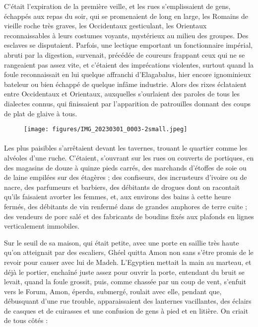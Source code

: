 \documentclass[a4paper, 11pt, oneside, polutonikogreek, french]{article}
\begin{document}
C'était l'expiration de la première veille, et les rues s'emplissaient de gens, échappés aux repas du soir, qui se promenaient de long en large, les Romains de vieille roche très graves, les Occidentaux gesticulant, les Orientaux reconnaissables à leurs costumes voyants, mystérieux au milieu des groupes. Des esclaves se disputaient. Parfois, une lectique emportant un fonctionnaire impérial, abruti par la digestion, survenait, précédée de coureurs frappant ceux qui ne se rangeaient pas assez vite, et c'étaient des imprécations violentes, surtout quand la foule reconnaissait en lui quelque affranchi d'Elagabalus, hier encore ignominieux bateleur ou bien échappé de quelque infâme industrie. Alors des rixes éclataient entre Occidentaux et Orientaux, auxquelles s'ourlaient des paroles de tous les dialectes connus, qui finissaient par l'apparition de patrouilles donnant des coups de plat de glaive à tous.
\clearpage
\begin{landscape}
\pagestyle{fancy}
\fancyhf{}
\cfoot{\thepage}
\begin{figure}[H]
\centering
\texttt{[image: figures/IMG\_20230301\_0003-2small.jpeg]}
\end{figure}
\end{landscape}
\clearpage
\paragraph{}
Les plus paisibles s'arrêtaient devant les tavernes, trouant le quartier comme les alvéoles d'une ruche. C'étaient, s'ouvrant sur les rues ou couverts de portiques, en des magasins de douze à quinze pieds carrés, des marchands d'étoffes de soie ou de laine empilées sur des étagères ; des confiseurs, des incrusteurs d'ivoire ou de nacre, des parfumeurs et barbiers, des débitants de drogues dont on racontait qu'ils faisaient avorter les femmes, et, aux environs des bains à cette heure fermés, des débitants de vin renfermé dans de grandes amphores de terre cuite ; des vendeurs de porc salé et des fabricants de boudins fixés aux plafonds en lignes verticalement immobiles.

Sur le seuil de sa maison, qui était petite, avec une porte en saillie très haute qu'on atteignait par des escaliers, Ghéel quitta Amon non sans s'être promis de le revoir pour causer avec lui de Madeh. L'Egyptien mettait la main au marteau, et déjà le portier, enchaîné juste assez pour ouvrir la porte, entendant du bruit se levait, quand la foule grossit, puis, comme chassée par un coup de vent, s'enfuit vers le Forum, Amon, éperdu, submergé, roulait avec elle, pendant que, débusquant d'une rue trouble, apparaissaient des lanternes vacillantes, des éclairs de casques et de cuirasses et une confusion de gens à pied et en litière. On criait de tous côtés :
\end{document}
